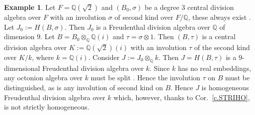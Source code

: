 \documentclass{amsart}
\theoremstyle{definition} %
\newtheorem{eg}[equation]{Example}
\theoremstyle{remark} %
\renewcommand{\:}{\colon\,}
\numberwithin{equation}{section}
\begin{document}
\begin{eg}\label{homog-not-str-homog}
Let $F=\mathbb{Q}(\sqrt{2})$ and $(B_0,\sigma)$ be a degree $3$ central division algebra over $F$ with an involution $\sigma$ of second kind over $F/\mathbb{Q}$, these always exist \cite[Chap.~5,~Prop.~1]{MR340440}. Let $J_0:=H(B,\sigma)$. Then $J_0$ is a Freudenthal division algebra over $\mathbb{Q}$ of dimension $9$. Let $B=B_0\otimes_{\mathbb{Q}}\mathbb{Q}(i)$ and $\tau=\sigma\otimes 1$. Then $(B,\tau)$ is a central division algebra over $K:=\mathbb{Q}(\sqrt{2})(i)$ with an involution $\tau$ of the second kind over $K/k$, where $k=\mathbb{Q}(i)$. Consider $J:={J_0}\otimes_{\mathbb{Q}}k$. Then $J=H(B,\tau)$ is a $9$-dimensional Freudenthal division algebra over $k$. Since $k$ has no real embeddings, any octonion algebra over $k$ must be split \cite[Cor.~23.21]{MR4806163}. Hence the involution $\tau$ on $B$ must be distinguished, as is any involution of second kind on $B$. Hence $J$ is homogeneous Freudenthal division algebra over $k$ which, however, thanks to Cor.~\ref{c.STRIHO}, is not strictly homogeneous. 
\end{eg}
\end{document}
